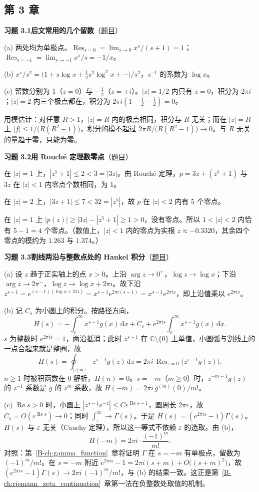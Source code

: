 \documentclass[11pt,a4paper]{article}
\DeclareMathOperator{\Res}{Res}
\newcommand{\CC}{\mathbb{C}}
\newcommand{\dd}{\,\mathrm{d}}
\renewcommand{\Re}{\operatorname{Re}}
\newcommand{\bref}[1]{\ref*{B-#1}}
\newcommand{\Sol}[2]{%
  \par\addvspace{1.2em}\noindent
  \hypertarget{s:#1}{}\textbf{习题 #1\quad #2}\hfill{\small（\hyperlink{q:#1}{题目}）}\par
  \nopagebreak\smallskip}
\begin{document}
\subsection*{第 3 章}

\Sol{3.1}{后文常用的几个留数}
(a) 两处均为单极点。$\Res_{s=0}=\lim_{s\to0}x^s/(s+1)=1$；$\Res_{s=-1}=\lim_{s\to-1}x^s/s=-1/x$。

(b) $x^s/s^2=\bigl(1+s\log x+\tfrac12s^2\log^2x+\cdots\bigr)/s^2$，$s^{-1}$ 的系数为 $\log x$。

(c) 留数分别为 $1$（$z=0$）与 $-\tfrac12$（$z=\pm i$）。$|z|=1/2$ 内只有 $z=0$，积分为 $2\pi i$；$|z|=2$ 内三个极点都在，积分为 $2\pi i(1-\tfrac12-\tfrac12)=0$。

用模估计：对任意 $R>1$，$|z|=R$ 内的极点相同，积分与 $R$ 无关；而在 $|z|=R$ 上 $|f|\le1/\bigl(R(R^2-1)\bigr)$，积分的模不超过 $2\pi R/\bigl(R(R^2-1)\bigr)\to0$。与 $R$ 无关的量趋于零，只能为零。

\Sol{3.2}{用 Rouché 定理数零点}
在 $|z|=1$ 上，$|z^5+1|\le2<3=|3z|$。由 Rouché 定理，$p=3z+(z^5+1)$ 与 $3z$ 在 $|z|<1$ 内零点个数相同，为 $1$。

在 $|z|=2$ 上，$|3z+1|\le7<32=|z^5|$，故 $p$ 在 $|z|<2$ 内有 $5$ 个零点。

在 $|z|=1$ 上 $|p(z)|\ge|3z|-|z^5+1|\ge1>0$，没有零点。所以 $1<|z|<2$ 内恰有 $5-1=4$ 个零点。（数值上，$|z|<1$ 内的零点为实根 $z\approx-0.3320$，其余四个零点的模约为 $1.263$ 与 $1.374$。）

\Sol{3.3}{割线两沿与整数点处的 Hankel 积分}
(a) 设 $z$ 趋于正实轴上的点 $x>0$。上沿 $\arg z\to0^+$，$\log z\to\log x$；下沿 $\arg z\to2\pi^-$，$\log z\to\log x+2\pi i$。故下沿
$z^{s-1}=e^{(s-1)(\log x+2\pi i)}=x^{s-1}e^{2\pi i(s-1)}=x^{s-1}e^{2\pi is}$，即上沿值乘以 $e^{2\pi is}$。

(b) 记 $C_\varepsilon$ 为小圆上的积分。按路径方向，
\[
  H(s)=-\int_\varepsilon^\infty x^{s-1}g(x)\dd x+C_\varepsilon+e^{2\pi is}\int_\varepsilon^\infty x^{s-1}g(x)\dd x .
\]
$s$ 为整数时 $e^{2\pi is}=1$，两沿抵消；此时 $z^{s-1}$ 在 $\CC\setminus\{0\}$ 上单值，小圆弧与割线上的一点合起来就是整圈，故
\[
  H(s)=\oint_{|z|=\varepsilon}z^{s-1}g(z)\dd z=2\pi i\,\Res_{z=0}\bigl(z^{s-1}g(z)\bigr).
\]
$n\ge1$ 时被积函数在 $0$ 解析，$H(n)=0$。$s=-m$（$m\ge0$）时，$z^{-m-1}g(z)$ 的 $z^{-1}$ 系数是 $g$ 的 $z^m$ 系数，故 $H(-m)=2\pi i\,g^{(m)}(0)/m!$。

(c) $\Re s>0$ 时，小圆上 $|z^{s-1}e^{-z}|\le C\varepsilon^{\Re s-1}$，圆周长 $2\pi\varepsilon$，故 $C_\varepsilon=O(\varepsilon^{\Re s})\to0$；同时 $\int_\varepsilon^\infty\to\Gamma(s)$。于是 $H(s)=(e^{2\pi is}-1)\Gamma(s)$。$H(s)$ 与 $\varepsilon$ 无关（Cauchy 定理），所以这一等式不依赖 $\varepsilon$ 的选取。由 (b)，
\[
  H(-m)=2\pi i\cdot\frac{(-1)^m}{m!}.
\]
对照：第~\bref{ch:gamma_function}~章将证明 $\Gamma$ 在 $s=-m$ 有单极点，留数为 $(-1)^m/m!$。在 $s=-m$ 附近 $e^{2\pi is}-1=2\pi i(s+m)+O\bigl((s+m)^2\bigr)$，故 $(e^{2\pi is}-1)\Gamma(s)\to2\pi i\,(-1)^m/m!$，与 (b) 的结果一致。这正是第~\bref{ch:riemann_zeta_continuation}~章第一法在负整数处取值的机制。
\end{document}
